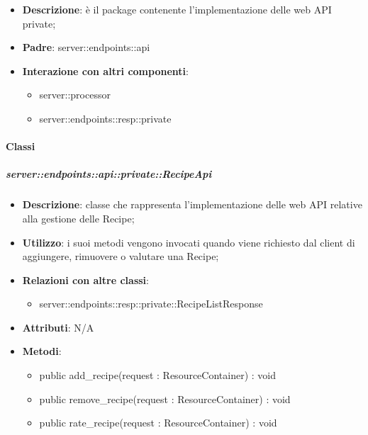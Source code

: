 \begin{itemize}
  \item \textbf{Descrizione}: è il package contenente l'implementazione delle web API private;
  \item \textbf{Padre}: server::endpoints::api
  \item \textbf{Interazione con altri componenti}:
  	\begin{itemize}
        \item server::processor
				\item server::endpoints::resp::private
    \end{itemize}
\end{itemize}

	\paragraph{Classi} %

    \subparagraph{server::endpoints::api::private::RecipeApi} %
    \label{subp:bdsm_app_server_endpoints_api_private_recipeapi}
    \begin{itemize}
      \item \textbf{Descrizione}: classe che rappresenta l'implementazione delle web API relative alla gestione delle Recipe;
      \item \textbf{Utilizzo}: i suoi metodi vengono invocati quando viene richiesto dal client di aggiungere, rimuovere o valutare una Recipe;
      \item \textbf{Relazioni con altre classi}:
        \begin{itemize}
          \item server::endpoints::resp::private::RecipeListResponse
        \end{itemize}
		\item \textbf{Attributi}: N/A
		\item \textbf{Metodi}:   
			\begin{itemize}
				\item public add\_recipe(request : ResourceContainer) : void
				\item public remove\_recipe(request : ResourceContainer) : void
				\item public rate\_recipe(request : ResourceContainer) : void
     	 \end{itemize}
      \end{itemize}

